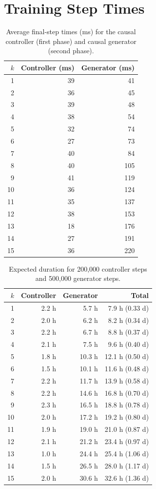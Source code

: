 \documentclass[11pt]{article}
\begin{document}
\section{Training Step Times}
\begin{table}[H]\centering
\caption{Average final-step times (ms) for the causal controller (first phase) and causal generator (second phase).}
\label{tab:step}
\begin{tabular}{rrr}\toprule $k$ & Controller (ms) & Generator (ms) \\ \midrule
1 & 39 & 41 \\
2 & 36 & 45 \\
3 & 39 & 48 \\
4 & 38 & 54 \\
5 & 32 & 74 \\
6 & 27 & 73 \\
7 & 40 & 84 \\
8 & 40 & 105 \\
9 & 41 & 119 \\
10 & 36 & 124 \\
11 & 35 & 137 \\
12 & 38 & 153 \\
13 & 18 & 176 \\
14 & 27 & 191 \\
15 & 36 & 220 \\
\bottomrule\end{tabular}\end{table}
\begin{table}[H]\centering
\caption{Expected duration for 200,000 controller steps and 500,000 generator steps.}
\label{tab:duration}
\begin{tabular}{rrrr}\toprule $k$ & Controller & Generator & Total \\ \midrule
1 & 2.2 h & 5.7 h & 7.9 h (0.33 d) \\
2 & 2.0 h & 6.2 h & 8.2 h (0.34 d) \\
3 & 2.2 h & 6.7 h & 8.8 h (0.37 d) \\
4 & 2.1 h & 7.5 h & 9.6 h (0.40 d) \\
5 & 1.8 h & 10.3 h & 12.1 h (0.50 d) \\
6 & 1.5 h & 10.1 h & 11.6 h (0.48 d) \\
7 & 2.2 h & 11.7 h & 13.9 h (0.58 d) \\
8 & 2.2 h & 14.6 h & 16.8 h (0.70 d) \\
9 & 2.3 h & 16.5 h & 18.8 h (0.78 d) \\
10 & 2.0 h & 17.2 h & 19.2 h (0.80 d) \\
11 & 1.9 h & 19.0 h & 21.0 h (0.87 d) \\
12 & 2.1 h & 21.2 h & 23.4 h (0.97 d) \\
13 & 1.0 h & 24.4 h & 25.4 h (1.06 d) \\
14 & 1.5 h & 26.5 h & 28.0 h (1.17 d) \\
15 & 2.0 h & 30.6 h & 32.6 h (1.36 d) \\
\bottomrule\end{tabular}\end{table}
\end{document}
